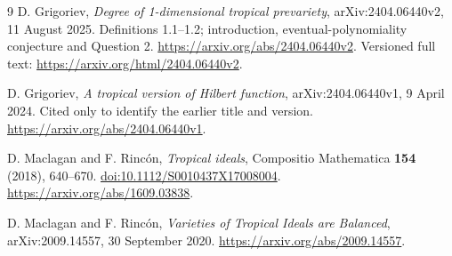 \documentclass[11pt,a4paper]{article}
\numberwithin{equation}{section}
\theoremstyle{definition}
\theoremstyle{remark}
\begin{document}
\begin{thebibliography}{9}
D. Grigoriev,
\emph{Degree of 1-dimensional tropical prevariety},
arXiv:2404.06440v2, 11 August 2025.
Definitions 1.1--1.2; introduction, eventual-polynomiality conjecture and
Question 2.
\url{https://arxiv.org/abs/2404.06440v2}.
Versioned full text:
\url{https://arxiv.org/html/2404.06440v2}.

D. Grigoriev,
\emph{A tropical version of Hilbert function},
arXiv:2404.06440v1, 9 April 2024.
Cited only to identify the earlier title and version.
\url{https://arxiv.org/abs/2404.06440v1}.

D. Maclagan and F. Rinc\'on,
\emph{Tropical ideals},
Compositio Mathematica \textbf{154} (2018), 640--670.
\href{https://doi.org/10.1112/S0010437X17008004}{doi:10.1112/S0010437X17008004}.
\url{https://arxiv.org/abs/1609.03838}.

D. Maclagan and F. Rinc\'on,
\emph{Varieties of Tropical Ideals are Balanced},
arXiv:2009.14557, 30 September 2020.
\url{https://arxiv.org/abs/2009.14557}.
\end{thebibliography}
\end{document}
